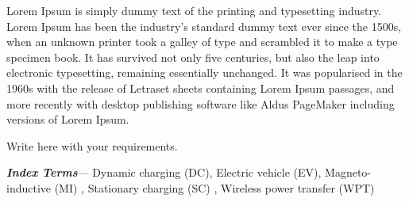 	
	Lorem Ipsum is simply dummy text of the printing and typesetting industry. Lorem Ipsum has been the industry's standard dummy text ever since the 1500s, when an unknown printer took a galley of type and scrambled it to make a type specimen book. It has survived not only five centuries, but also the leap into electronic typesetting, remaining essentially unchanged. It was popularised in the 1960s with the release of Letraset sheets containing Lorem Ipsum passages, and more recently with desktop publishing software like Aldus PageMaker including versions of Lorem Ipsum.
	\vspace{3\baselineskip}
    \begin{center}
        \Large Write here with your requirements.
    \end{center}
	\vspace{3\baselineskip}
    
	\textbf{\textit{Index Terms}}— Dynamic charging (DC), Electric vehicle (EV), Magneto-inductive (MI) , Stationary charging (SC) , Wireless power transfer (WPT)
	








	




	